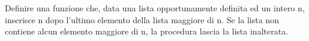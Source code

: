 \begin{Exercise}[label={ex:bigger}]
    Definire una funzione che, data una lista opportunamente definita ed un intero n, 
    inserisce n dopo l’ultimo elemento della lista maggiore di n. Se la lista non contiene
    alcun elemento maggiore di n, la procedura lascia la lista inalterata.
\end{Exercise}

\begin{Answer}[ref={ex:bigger}]
  	
\end{Answer}